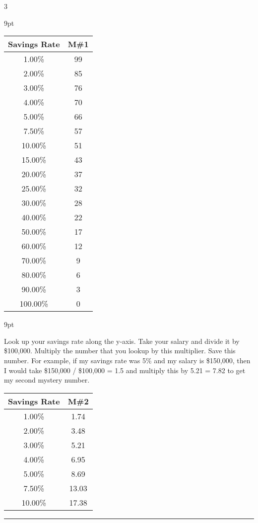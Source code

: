 \documentclass[landscape]{article}
\newcommand{\myline}{\vspace{4pt}\hrule  \vspace{4pt}}
\newenvironment{topic}[1]{
	\noindent \textbf{\textsc{\color{harvardcrimson}{#1}}}
	\noindent \hspace{-3.5pt}
}{
	\myline
}
\newenvironment{tellme}[1]{
	\noindent \textbf{\textit{\color{harvardblue}{#1}}}
	\begin{adjustwidth}{9pt}{}
	}{
	\end{adjustwidth}
}
\begin{document}
\begin{multicols*}{3}
\begin{topic}{Numbers Game}
\begin{tellme}{Computing Mystery Number One}
			\begin{center}
				\begin{tabular}{cc}
					\toprule
					Savings Rate & M\#1\\
					\midrule
					1.00\% & 99\\ 
					2.00\% & 85\\ 
					3.00\% & 76\\ 
					4.00\% & 70\\ 
					5.00\% & 66\\ 
					7.50\% & 57\\ 
					10.00\% & 51\\ 
					15.00\% & 43\\ 
					20.00\% & 37\\ 
					25.00\% & 32\\ 
					30.00\% & 28\\ 
					40.00\% & 22\\ 
					50.00\% & 17\\ 
					60.00\% & 12\\ 
					70.00\% & 9\\ 
					80.00\% & 6\\ 
					90.00\% & 3\\ 
					100.00\% & 0\\ 
					\bottomrule
				\end{tabular}
			\end{center}
		\end{tellme}
	\vspace{3\baselineskip}
		\begin{tellme}{Computing Mystery Number Two}
			Look up your savings rate along the y-axis. Take your salary and divide it by \$100,000. Multiply the number that you lookup by this multiplier. Save this number. For example, if my savings rate was 5\% and my salary is \$150,000, then I would take \$150,000 / \$100,000 = 1.5 and multiply this by 5.21 = 7.82 to get my second mystery number.
			\begin{center}
				\begin{tabular}{cc}
					\toprule
					Savings Rate & M\#2\\
					\midrule
					1.00\% & 1.74 \\ 
					2.00\% & 3.48 \\ 
					3.00\% & 5.21 \\ 
					4.00\% & 6.95 \\ 
					5.00\% & 8.69 \\ 
					7.50\% & 13.03 \\ 
					10.00\% & 17.38 \\ 

\end{tabular}
\end{center}
\end{tellme}
\end{topic}
\end{multicols*}
\end{document}

